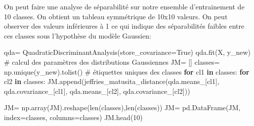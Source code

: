 \documentclass[
  11pt,
  letterpaper,
  open=any,
  twoside=false,
  french]{scrbook}
\newenvironment{Shaded}{\begin{snugshade}}{\end{snugshade}}
\newcommand{\BuiltInTok}[1]{\textcolor[rgb]{0.00,0.23,0.31}{#1}}
\newcommand{\CommentTok}[1]{\textcolor[rgb]{0.37,0.37,0.37}{#1}}
\newcommand{\ControlFlowTok}[1]{\textcolor[rgb]{0.00,0.23,0.31}{\textbf{#1}}}
\newcommand{\DecValTok}[1]{\textcolor[rgb]{0.68,0.00,0.00}{#1}}
\newcommand{\KeywordTok}[1]{\textcolor[rgb]{0.00,0.23,0.31}{\textbf{#1}}}
\newcommand{\NormalTok}[1]{\textcolor[rgb]{0.00,0.23,0.31}{#1}}
\newcommand{\OperatorTok}[1]{\textcolor[rgb]{0.37,0.37,0.37}{#1}}
\newcommand{\VariableTok}[1]{\textcolor[rgb]{0.07,0.07,0.07}{#1}}
\begin{document}
On peut faire une analyse de séparabilité sur notre ensemble
d'entrainement de 10 classes. On obtient un tableau symmétrique de 10x10
valeurs. On peut observer des valeurs inférieures à 1 ce qui indique des
séparabilités faibles entre ces classes sous l'hypothèse du modèle
Gaussien:

\begin{Shaded}
\begin{Highlighting}[]
\NormalTok{qda}\OperatorTok{=}\NormalTok{ QuadraticDiscriminantAnalysis(store\_covariance}\OperatorTok{=}\VariableTok{True}\NormalTok{)}
\NormalTok{qda.fit(X, y\_new) }\CommentTok{\# calcul des paramètres des distributions Gaussiennes}
\NormalTok{JM}\OperatorTok{=}\NormalTok{ []}
\NormalTok{classes}\OperatorTok{=}\NormalTok{ np.unique(y\_new).tolist() }\CommentTok{\# étiquettes uniques des classes}
\ControlFlowTok{for}\NormalTok{ cl1 }\KeywordTok{in}\NormalTok{ classes:}
  \ControlFlowTok{for}\NormalTok{ cl2 }\KeywordTok{in}\NormalTok{ classes:}
\NormalTok{    JM.append(jeffries\_matusita\_distance(qda.means\_[cl1], qda.covariance\_[cl1], qda.means\_[cl2], qda.covariance\_[cl2]))}

\NormalTok{JM}\OperatorTok{=}\NormalTok{ np.array(JM).reshape(}\BuiltInTok{len}\NormalTok{(classes),}\BuiltInTok{len}\NormalTok{(classes))}
\NormalTok{JM}\OperatorTok{=}\NormalTok{ pd.DataFrame(JM, index}\OperatorTok{=}\NormalTok{classes, columns}\OperatorTok{=}\NormalTok{classes)}
\NormalTok{JM.head(}\DecValTok{10}\NormalTok{)}
\end{Highlighting}
\end{Shaded}
\end{document}
